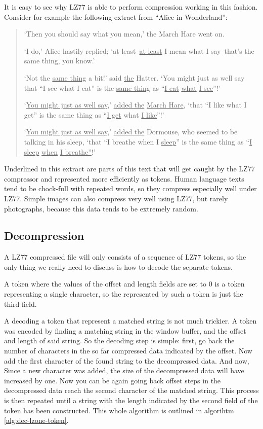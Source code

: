 It is easy to see why LZ77 is able to perform compression working in
this fashion. Consider for example the following extract from ``Alice in
Wonderland'':

\begin{quote}
  `Then you should say what you mean,' the March Hare went on.

  `I do,' Alice hastily replied; `at least--\underline{at least} I
  mean what I say--that's the same thing, you know.'

  `Not the \underline{same thing} a bit!' said \underline{the} Hatter.
  `You might just as well say that ``I see what I eat'' is the
  \underline{same thing} as ``\underline{I eat} \underline{what}
  \underline{I see}''!'

  `\underline{You might just as well say},' \underline{added the}
  \underline{March Hare}, `that ``I like what I get'' is the same
  thing as ``\underline{I get} what \underline{I like}''!'

  `\underline{You might just as well say},' \underline{added the}
  Dormouse, who seemed to be talking in his sleep, `that ``I breathe
  when I \underline{sleep}'' is the same thing as ``\underline{I
    sleep} \underline{when} \underline{I breathe''}!'

\end{quote}

Underlined in this extract are parts of this text that will get caught
by the LZ77 compressor and represented more efficiently as
tokens. Human language texts tend to be chock-full with repeated words,
so they compress especially well under LZ77. Simple images can also
compress very well using LZ77, but rarely photographs, because this
data tends to be extremely random.

\subsection{Decompression}

A LZ77 compressed file will only consists of a sequence of LZ77
tokens, so the only thing we really need to discuss is how to decode
the separate tokens.

A token where the values of the offset and length fields are set to
$0$ is a token representing a single character, so the represented by
such a token is just the third field.

A decoding a token that represent a matched string is not much
trickier. A token was encoded by finding a matching string in the
window buffer, and the offset and length of said string. So the
decoding step is simple: first, go back the number of characters in
the so far compressed data indicated by the offset. Now add the first
character of the found string to the decompressed data. And now, Since a new
character was added, the size of the decompressed data will have
increased by one. Now you can be again going back offset steps in the
decompressed data reach the second character of the matched
string. This process is then repeated until a string with the length
indicated by the second field of the token has been constructed. This
whole algorithm is outlined in algorihtm \ref{alg:dec-lzone-token}.

